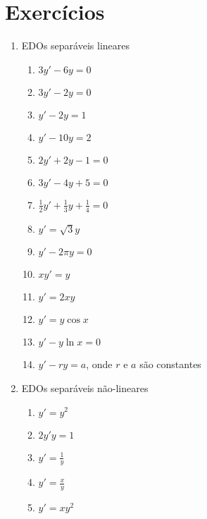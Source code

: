 \documentclass[a4paper]{article}
\begin{document}
\section{Exercícios}

\begin{enumerate}

\item EDOs separáveis lineares
  \begin{enumerate}
  \item $3y' -6y = 0 $
  \item $3y' -2y =0$
  \item $y' - 2y = 1$
  \item $y' - 10y = 2$
  \item $2y' + 2y -1 = 0$
  \item $3y'- 4y +5 = 0$
  \item $\frac{1}{2} y' + \frac{1}{3} y + \frac{1}{4} = 0$
  \item $y' = \sqrt{3}y$
  \item $y' -2\pi y =0$
  \item $xy' = y$
  \item $y' = 2xy$
  \item $y' = y\cos x$
  \item $y' - y\ln x = 0$
  \item $y' -ry = a$, onde $r$ e $a$ são constantes

  \end{enumerate}

\item EDOs separáveis não-lineares
  \begin{enumerate}
  \item $y' = y^2$
  \item $2y'y = 1$
  \item $y' = \frac{1}{y}$
  \item $y' = \frac{x}{y}$
  \item $y' = xy^2$
  \end{enumerate}

\end{enumerate}
\end{document}
